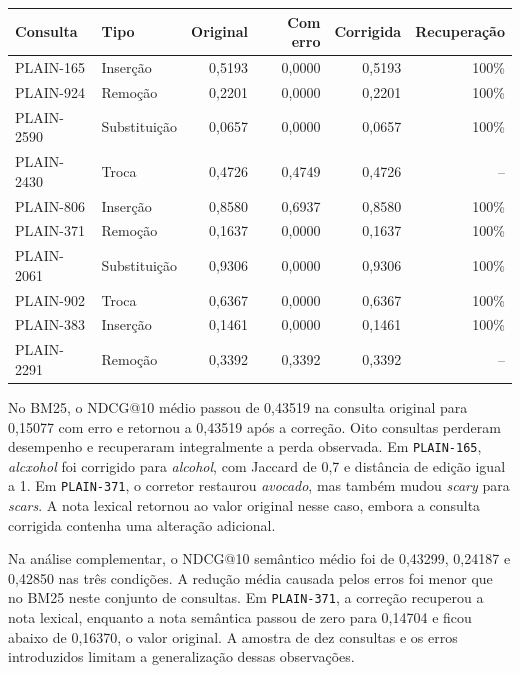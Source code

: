 \documentclass[12pt]{article}
\begin{document}
\noindent\begin{minipage}{\linewidth}
\centering
\small
{}
\label{tab:erros}
\begin{tabular}{@{}llrrrr@{}}
\toprule
Consulta & Tipo & Original & Com erro & Corrigida & Recuperação \\
\midrule
PLAIN-165 & Inserção & 0,5193 & 0,0000 & 0,5193 & 100\% \\
PLAIN-924 & Remoção & 0,2201 & 0,0000 & 0,2201 & 100\% \\
PLAIN-2590 & Substituição & 0,0657 & 0,0000 & 0,0657 & 100\% \\
PLAIN-2430 & Troca & 0,4726 & 0,4749 & 0,4726 & -- \\
PLAIN-806 & Inserção & 0,8580 & 0,6937 & 0,8580 & 100\% \\
PLAIN-371 & Remoção & 0,1637 & 0,0000 & 0,1637 & 100\% \\
PLAIN-2061 & Substituição & 0,9306 & 0,0000 & 0,9306 & 100\% \\
PLAIN-902 & Troca & 0,6367 & 0,0000 & 0,6367 & 100\% \\
PLAIN-383 & Inserção & 0,1461 & 0,0000 & 0,1461 & 100\% \\
PLAIN-2291 & Remoção & 0,3392 & 0,3392 & 0,3392 & -- \\
\bottomrule
\end{tabular}
\end{minipage}
\par\medskip

No BM25, o NDCG@10 médio passou de 0,43519 na consulta original para
0,15077 com erro e retornou a 0,43519 após a correção. Oito consultas
perderam desempenho e recuperaram integralmente a perda observada.
Em \texttt{PLAIN-165}, \textit{alcxohol} foi corrigido para
\textit{alcohol}, com Jaccard de 0,7 e distância de edição igual a 1.
Em \texttt{PLAIN-371}, o corretor restaurou \textit{avocado}, mas
também mudou \textit{scary} para \textit{scars}. A nota lexical retornou
ao valor original nesse caso, embora a consulta corrigida contenha
uma alteração adicional.

Na análise complementar, o NDCG@10 semântico médio foi de 0,43299,
0,24187 e 0,42850 nas três condições. A redução média causada pelos
erros foi menor que no BM25 neste conjunto de consultas. Em
\texttt{PLAIN-371}, a correção recuperou a nota lexical, enquanto a nota
semântica passou de zero para 0,14704 e ficou abaixo de 0,16370, o
valor original. A amostra de dez consultas e os erros introduzidos
limitam a generalização dessas observações.
\end{document}
